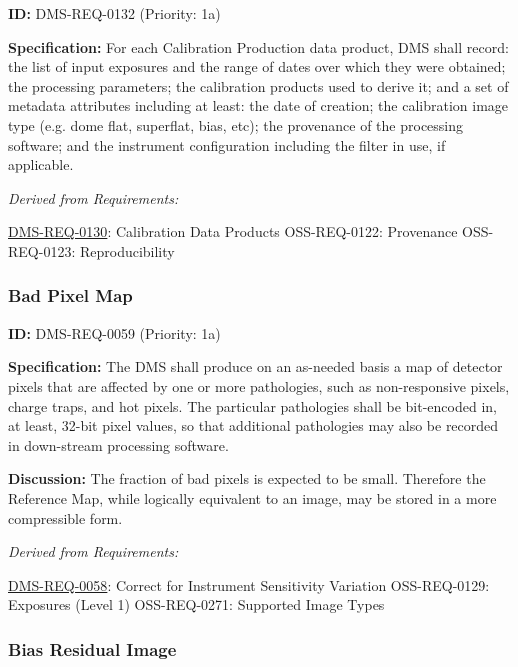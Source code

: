 \documentclass[SE,toc,lsstdraft]{lsstdoc}
\begin{document}
\label{DMS-REQ-0132}
\textbf{ID:} DMS-REQ-0132 (Priority: 1a)

\textbf{Specification:} For each Calibration Production data product, DMS shall record: the list of input exposures and the range of dates over which they were obtained; the processing parameters; the calibration products used to derive it; and a set of metadata attributes including at least: the date of creation; the calibration image type (e.g. dome flat, superflat, bias, etc); the provenance of the processing software; and the instrument configuration including the filter in use, if applicable.

\emph{Derived from Requirements:}

\hyperref[DMS-REQ-0130]{DMS-REQ-0130}:
Calibration Data Products \newline
OSS-REQ-0122:
Provenance \newline
OSS-REQ-0123:
Reproducibility \newline

\subsubsection{Bad Pixel Map}

\label{DMS-REQ-0059}
\textbf{ID:} DMS-REQ-0059 (Priority: 1a)

\textbf{Specification: }The DMS shall produce on an as-needed basis a map of detector pixels that are affected by one or more pathologies, such as non-responsive pixels, charge traps, and hot pixels. The particular pathologies shall be bit-encoded in, at least, 32-bit pixel values, so that additional pathologies may also be recorded in down-stream processing software.

\textbf{Discussion:} The fraction of bad pixels is expected to be small. Therefore the Reference Map, while logically equivalent to an image, may be stored in a more compressible form.

\emph{Derived from Requirements:}

\hyperref[DMS-REQ-0058]{DMS-REQ-0058}:
Correct for Instrument Sensitivity Variation \newline
OSS-REQ-0129:
Exposures (Level 1) \newline
OSS-REQ-0271:
Supported Image Types \newline

\subsubsection{Bias Residual Image}
\end{document}

